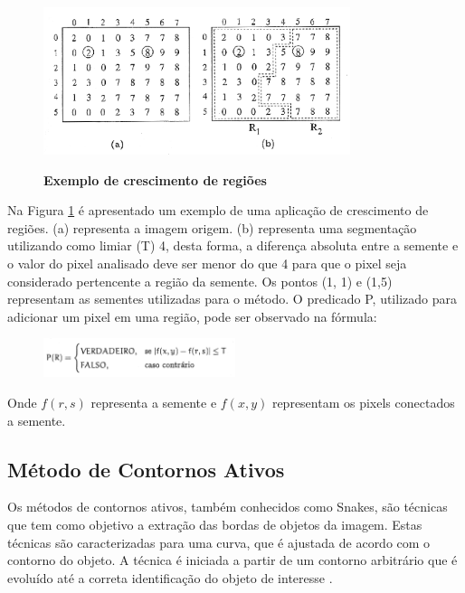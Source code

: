 \documentclass[
	12pt,				%
	oneside,			%
	a4paper,			%
	english,			%
	french,				%
	spanish,			%
	brazil,				%
	]{abntex2}
\begin{document}
\begin{figure}[ht]
\centering
\caption{\textbf{Exemplo de crescimento de regiões}}
\includegraphics[width=0.8\textwidth]{imagens/crescimento_regiao.png}
\label{fig:crescimento_regiao}
\end{figure}

Na Figura \ref{fig:crescimento_regiao} é apresentado um exemplo de uma aplicação de crescimento de regiões. (a) representa a imagem origem. (b) representa uma segmentação utilizando como limiar (T) 4, desta forma, a diferença absoluta entre a semente e o valor do pixel analisado deve ser menor do que 4 para que o pixel seja considerado pertencente a região da semente. Os pontos (1, 1) e (1,5) representam as sementes utilizadas para o método. O predicado P, utilizado para adicionar um pixel em uma região, pode ser observado na fórmula:

\begin{figure}[ht]
\centering
\includegraphics[width=0.5\textwidth]{imagens/crescimentoregiao_formula.png}
\end{figure}

Onde \(f(r,s)\) representa a semente e \(f(x, y)\) representam os pixels conectados a semente.
    
\subsection{Método de Contornos Ativos}     

Os métodos de contornos ativos, também conhecidos como Snakes, são técnicas que tem como objetivo a extração das bordas de objetos da imagem. Estas técnicas são caracterizadas para uma curva, que é ajustada de acordo com o contorno do objeto. A técnica é iniciada a partir de um contorno arbitrário que é evoluído até a correta identificação do objeto de interesse \cite{conciAzevedoLeta:2008}.
\end{document}
